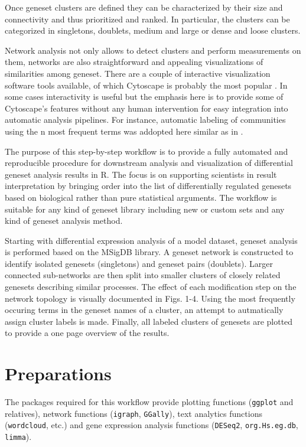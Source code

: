 \documentclass[9pt,a4paper,]{extarticle}
\theoremstyle{definition}
\theoremstyle{definition}
\theoremstyle{definition}
\theoremstyle{remark}
\begin{document}
Once geneset clusters are defined they can be characterized by their size and connectivity and thus prioritized and ranked. In particular, the clusters can be categorized in singletons, doublets, medium and large or dense and loose clusters.

Network analysis not only allows to detect clusters and perform measurements on them, networks are also straightforward and appealing visualizations of similarities among geneset. There are a couple of interactive visualization software tools available, of which Cytoscape is probably the most popular \citep{Shannon2003}. In some cases interactivity is useful but the emphasis here is to provide some of Cytoscape's features without any human intervention for easy integration into automatic analysis pipelines. For instance, automatic labeling of communities using the n most frequent terms was addopted here similar as in \citep{Kucera2016}.

The purpose of this step-by-step workflow is to provide a fully automated and reproducible procedure for downstream analysis and visualization of differential geneset analysis results in R. The focus is on supporting scientists in result interpretation by bringing order into the list of differentially regulated genesets based on biological rather than pure statistical arguments. The workflow is suitable for any kind of geneset library including new or custom sets and any kind of geneset analysis method.

Starting with differential expression analysis of a model dataset, geneset analysis is performed based on the MSigDB library. A geneset network is constructed to identify isolated genesets (singletons) and geneset pairs (doublets). Larger connected sub-networks are then split into smaller clusters of closely related genesets describing similar processes. The effect of each modification step on the network topology is visually documented in Figs. 1-4. Using the most frequently occuring terms in the geneset names of a cluster, an attempt to autmatically assign cluster labels is made. Finally, all labeled clusters of genesets are plotted to provide a one page overview of the results.

\section{Preparations}\label{preparations}

The packages required for this workflow provide plotting functions (\texttt{ggplot} and relatives), network functions (\texttt{igraph}, \texttt{GGally}), text analytics functions (\texttt{wordcloud}, etc.) and gene expression analysis functions (\texttt{DESeq2}, \texttt{org.Hs.eg.db}, \texttt{limma}).
\end{document}
